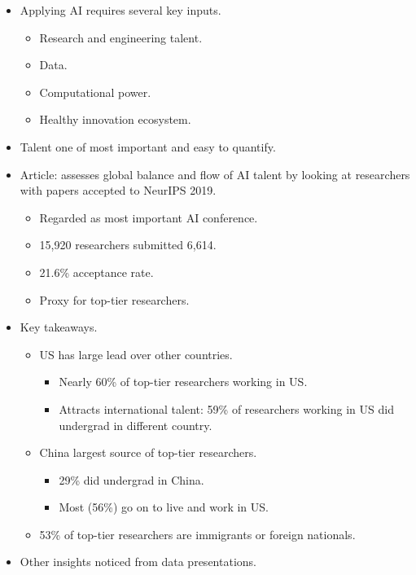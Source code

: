 \begin{itemize}
    \item Applying AI requires several key inputs.
    \begin{itemize}
        \item Research and engineering talent.
        \item Data.
        \item Computational power.
        \item Healthy innovation ecosystem.
    \end{itemize}
    \item Talent one of most important and easy to quantify.
    \item Article: assesses global balance and flow of AI talent by looking at researchers with papers accepted to NeurIPS 2019.
    \begin{itemize}
        \item Regarded as most important AI conference.
        \item 15,920 researchers submitted 6,614.
        \item 21.6\% acceptance rate.
        \item Proxy for top-tier researchers.
    \end{itemize}
    \item Key takeaways.
    \begin{itemize}
        \item US has large lead over other countries.
        \begin{itemize}
            \item Nearly 60\% of top-tier researchers working in US.
            \item Attracts international talent: 59\% of researchers working in US did undergrad in different country.
        \end{itemize}
        \item China largest source of top-tier researchers.
        \begin{itemize}
            \item 29\% did undergrad in China.
            \item Most (56\%) go on to live and work in US.
        \end{itemize}
        \item 53\% of top-tier researchers are immigrants or foreign nationals.
    \end{itemize}
    \item Other insights noticed from data presentations.

\end{itemize}
